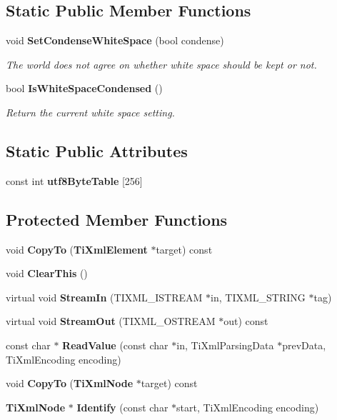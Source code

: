 \subsection*{Static Public Member Functions}
\begin{CompactItemize}
\item 
void {\bf Set\-Condense\-White\-Space} (bool condense)
\begin{CompactList}\small\item\em The world does not agree on whether white space should be kept or not. \item\end{CompactList}\item 
bool {\bf Is\-White\-Space\-Condensed} ()\label{classTiXmlBase_TiXmlUnknowne1}

\begin{CompactList}\small\item\em Return the current white space setting. \item\end{CompactList}\end{CompactItemize}
\subsection*{Static Public Attributes}
\begin{CompactItemize}
\item 
const int {\bf utf8Byte\-Table} [256]
\end{CompactItemize}
\subsection*{Protected Member Functions}
\begin{CompactItemize}
\item 
void {\bf Copy\-To} ({\bf Ti\-Xml\-Element} $\ast$target) const\label{classTiXmlElement_TiXmlElementb0}

\item 
void {\bf Clear\-This} ()\label{classTiXmlElement_TiXmlElementb1}

\item 
virtual void {\bf Stream\-In} (TIXML\_\-ISTREAM $\ast$in, TIXML\_\-STRING $\ast$tag)\label{classTiXmlElement_TiXmlElementb2}

\item 
virtual void {\bf Stream\-Out} (TIXML\_\-OSTREAM $\ast$out) const\label{classTiXmlElement_TiXmlElementb3}

\item 
const char $\ast$ {\bf Read\-Value} (const char $\ast$in, Ti\-Xml\-Parsing\-Data $\ast$prev\-Data, Ti\-Xml\-Encoding encoding)\label{classTiXmlElement_TiXmlElementb4}

\item 
void {\bf Copy\-To} ({\bf Ti\-Xml\-Node} $\ast$target) const\label{classTiXmlNode_TiXmlUnknownb3}

\item 
{\bf Ti\-Xml\-Node} $\ast$ {\bf Identify} (const char $\ast$start, Ti\-Xml\-Encoding encoding)\label{classTiXmlNode_TiXmlUnknownb4}

\end{CompactItemize}
